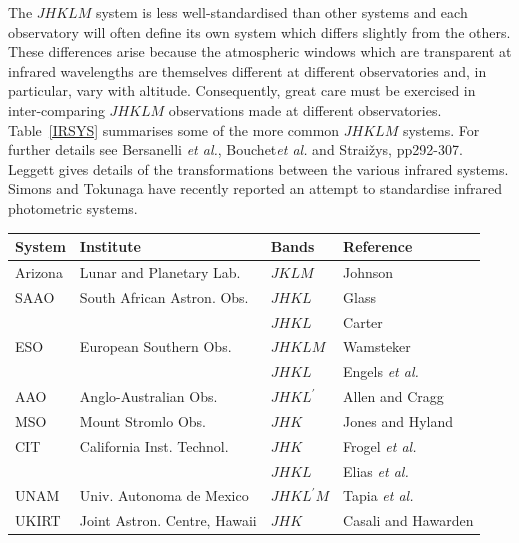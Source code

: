 \documentclass[twoside,11pt]{article}
\begin{document}
\begin{description}
   The $JHKLM$ system is less well-standardised than other systems and
   each observatory will often define its own system which differs slightly
   from the others.  These differences arise because the atmospheric
   windows which are transparent at infrared wavelengths are themselves
   different at different observatories and, in particular, vary with
   altitude.  Consequently, great care must be exercised in inter-comparing
   $JHKLM$ observations made at different observatories.
   Table~\ref{IRSYS} summarises some of the more common $JHKLM$ systems.
   For further details see Bersanelli {\it et al.}\/\cite{BERSANELLI91},
   Bouchet{\it et al.}\/\cite{BOUCHET91} and Strai\v{z}ys\cite{STRAIZYS92},
   pp292-307.  Leggett\cite{LEGGETT92} gives details of the transformations
   between the various infrared systems.  Simons and Tokunaga\cite{SIMONS01}
   have recently reported an attempt to standardise infrared photometric
   systems.

  \begin{table}[htbp]

  \begin{center}
  \begin{tabular}{llll}
   System  & Institute                    & Bands   & Reference \\ \hline
   Arizona & Lunar and Planetary Lab.     & $JKLM$  & Johnson\cite{JOHNSON64} \\
   SAAO    & South African Astron. Obs.   & $JHKL$  & Glass\cite{GLASS74} \\
           &                              & $JHKL$  & Carter\cite{CARTER84, CARTER90} \\
   ESO     & European Southern Obs.       & $JHKLM$ & Wamsteker\cite{WAMSTEKER81} \\
           &                              & $JHKL$  & Engels {\it et al.}\/\cite{ENGELS81} \\
   AAO     & Anglo-Australian Obs.        & $JHKL^{\prime}$ & Allen and Cragg\cite{ALLEN83} \\
   MSO     & Mount Stromlo Obs.           & $JHK$   & Jones and Hyland\cite{JONES82} \\
   CIT     & California Inst. Technol.    & $JHK$   & Frogel {\it et al.}\/\cite{FROGEL78} \\
           &                              & $JHKL$  & Elias {\it et al.}\/\cite{ELIAS82, ELIAS83} \\
   UNAM    & Univ. Autonoma de Mexico     & $JHKL^{\prime} M$ & Tapia {\it et al.}\/\cite{TAPIA86} \\
   UKIRT   & Joint Astron. Centre, Hawaii & $JHK$   & Casali and Hawarden\cite{CASALI92} \\
  \end{tabular}
  \end{center}


\end{table}
\end{description}
\end{document}
